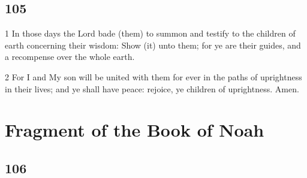 \chapter{105}

\par 1 In those days the Lord bade (them) to summon and testify to the children of earth concerning their wisdom: Show (it) unto them; for ye are their guides, and a recompense over the whole earth.
\par 2 For I and My son will be united with them for ever in the paths of uprightness in their lives; and ye shall have peace: rejoice, ye children of uprightness. Amen.

\part{Fragment of the Book of Noah}

\chapter{106}

